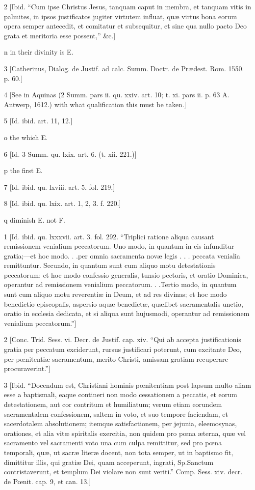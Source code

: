 2
[Ibid. “Cum ipse Christus Jesus, tanquam caput in membra, et tanquam vitis in palmites, in ipsos justificatos jugiter virtutem influat, quæ virtus bona eorum opera semper antecedit, et comitatur et subsequitur, et sine qua nullo pacto Deo grata et meritoria esse possent,” &c.]

n
in their divinity is E.

3
[Catherinus, Dialog. de Justif. ad calc. Summ. Doctr. de Prædest. Rom. 1550. p. 60.]

4
[See in Aquinas (2 Summ. pars ii. qu. xxiv. art. 10; t. xi. pars ii. p. 63 A. Antwerp, 1612.) with what qualification this must be taken.]

5
[Id. ibid. art. 11, 12.]

o
the which E.

6
[Id. 3 Summ. qu. lxix. art. 6. (t. xii. 221.)]

p
the first E.

7
[Id. ibid. qu. lxviii. art. 5. fol. 219.]

8
[Id. ibid. qu. lxix. art. 1, 2, 3. f. 220.]

q
diminish E. not F.

1
[Id. ibid. qu. lxxxvii. art. 3. fol. 292. “Triplici ratione aliqua causant remissionem venialium peccatorum. Uno modo, in quantum in eis infunditur gratia;—et hoc modo. . .per omnia sacramenta novæ legis . . . peccata venialia remittuntur. Secundo, in quantum sunt cum aliquo motu detestationis peccatorum: et hoc modo confessio generalis, tunsio pectoris, et oratio Dominica, operantur ad remissionem venialium peccatorum. . .Tertio modo, in quantum sunt cum aliquo motu reverentiæ in Deum, et ad res divinas; et hoc modo benedictio episcopalis, aspersio aquæ benedictæ, quælibet sacramentalis unctio, oratio in ecclesia dedicata, et si aliqua sunt hujusmodi, operantur ad remissionem venialium peccatorum.”]

2
[Conc. Trid. Sess. vi. Decr. de Justif. cap. xiv. “Qui ab accepta justificationis gratia per peccatum exciderunt, rursus justificari poterunt, cum excitante Deo, per pœnitentiæ sacramentum, merito Christi, amissam gratiam recuperare procuraverint.”]

3
[Ibid. “Docendum est, Christiani hominis pœnitentiam post lapsum multo aliam esse a baptismali, eaque contineri non modo cessationem a peccatis, et eorum detestationem, aut cor contritum et humiliatum; verum etiam eorundem sacramentalem confessionem, saltem in voto, et suo tempore faciendam, et sacerdotalem absolutionem; itemque satisfactionem, per jejunia, eleemosynas, orationes, et alia vitæ spiritalis exercitia, non quidem pro pœna æterna, quæ vel sacramento vel sacramenti voto una cum culpa remittitur, sed pro pœna temporali, quæ, ut sacræ literæ docent, non tota semper, ut in baptismo fit, dimittitur illis, qui gratiæ Dei, quam acceperunt, ingrati, Sp.Sanctum contristaverunt, et templum Dei violare non sunt veriti.” Comp. Sess. xiv. decr. de Pœnit. cap. 9, et can. 13.]

